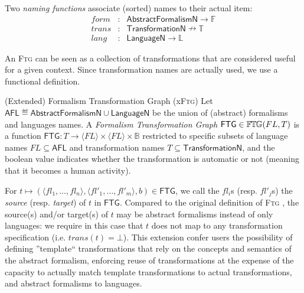 \begin{Definition}
   Two \emph{naming functions} associate (sorted) names to their actual item:
   \begin{displaymath}
      \begin{array}{rcl}
         form  &\colon& \mathsf{AbstractFormalismN} \to \mathbb{F}\\
         trans &\colon& \mathsf{TransformationN} \nrightarrow \mathbb{T}\\
         lang  &\colon& \mathsf{LanguageN} \to \mathbb{L}
      \end{array}
   \end{displaymath}
\end{Definition}

An \textsc{Ftg} can be seen as a collection of transformations that are 
considered useful for a given context. Since transformation names are actually used, we use a functional definition.

\begin{Definition}{(Extended) Formalism Transformation Graph (x\textsc{Ftg})}
Let $\mathsf{AFL} \eqdef \mathsf{AbstractFormalismN} \cup 
\mathsf{LanguageN}$ be the union of (abstract) formalisms and languages names. A 
\emph{Formalism Transformation Graph} $\mathsf{FTG} \in \mathbb{F}\mskip-1mu\mathbb{T}\mskip-1mu\mathbb{G}(FL, T)$ is a 
function  $\mathsf{FTG} \colon T \to \langle FL \rangle \times \langle FL 
\rangle \times \mathbb{B}$ restricted to specific subsets of language names $FL 
\subseteq \mathsf{AFL}$ and transformation names $T\subseteq 
\mathsf{TransformationN}$, and the boolean value indicates whether the 
transformation is automatic or not (meaning that it becomes a human activity).
%
\end{Definition}

\noindent
For $t \mapsto (\langle fl_1, \ldots, fl_n \rangle, \langle fl'_1, \ldots, 
fl'_m \rangle, b)\in \mathsf{FTG}$, we call the $fl_i$s (resp. $fl'_j$s) the 
\emph{source} (resp. \emph{target}) of $t$ in $\mathsf{FTG}$. 
Compared to the original definition of \textsc{Ftg} 
\cite{Mustafiz-etAl:2012,TR:Lucio-Mustafiz-etAl:2012}, the source(s) and/or 
target(s) of $t$ may be abstract formalisms instead of only languages: we 
require in this case that $t$ does not map to any transformation specification 
(i.e. $trans(t) = \bot$). This extension confer users the possibility of 
defining ''template`` transformations that rely on the concepts and semantics 
of the abstract formalism, enforcing reuse of transformations at the expense of 
the capacity to actually match template transformations to actual 
transformations, and abstract formalisms to languages. 

